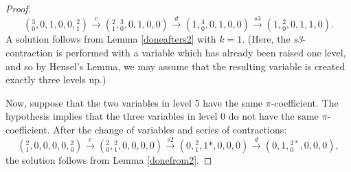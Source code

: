 \documentclass{article}
\begin{document}
\begin{proof}
$$({}^{3}_{0},0,1,0,0,{}^{2}_{1}) \xrightarrow{c} ({}^{2}_{1},{}^{3}_{0},0,1,0,0) \xrightarrow{d} (1,{}^{4}_{0},0,1,0,0) \xrightarrow{s3}(1,{}^{2}_{0},0,1,1,0).$$
A solution follows from Lemma \ref{doneafters2} with $k=1$.  (Here, the \textit{s3}-contraction is performed with a variable which has already been raised one level, and so by Hensel's Lemma, we may assume that the resulting variable is created exactly three levels up.)

Now, suppose that the two variables in level 5 have the same $\pi$-coefficient.
The hypothesis implies that the three variables in level 0 do not have the same $\pi$-coefficient.  After the change of variables and series of contractions:
$$({}^{2}_{1},0,0,0,0,{}^{2}_{0}) \xrightarrow{c} ({}^{2}_{0},{}^{2}_{1},0,0,0,0) \xrightarrow{s2} (0,{}^{2}_{1},1*,0,0,0) \xrightarrow{d} (0,1,{}^{2*}_{0},0,0,0),$$
the solution follows from Lemma \ref{donefrom2}.

\end{proof}
\end{document}
